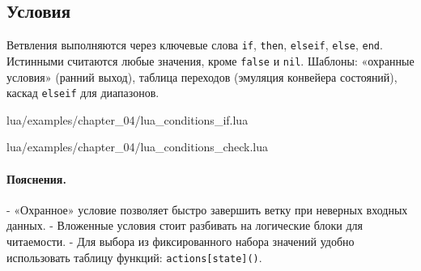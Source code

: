 \subsection{Условия}
Ветвления выполняются через ключевые слова \texttt{if}, \texttt{then}, \texttt{elseif}, \texttt{else}, \texttt{end}. Истинными считаются любые значения, кроме \texttt{false} и \texttt{nil}. Шаблоны: «охранные условия» (ранний выход), таблица переходов (эмуляция конвейера состояний), каскад \texttt{elseif} для диапазонов.
\begin{codefile}{lua/examples/chapter_04/lua_conditions_if.lua}
\end{codefile}
\begin{codefile}{lua/examples/chapter_04/lua_conditions_check.lua}
\end{codefile}
\paragraph{Пояснения.}
- «Охранное» условие позволяет быстро завершить ветку при неверных входных данных.
- Вложенные условия стоит разбивать на логические блоки для читаемости.
- Для выбора из фиксированного набора значений удобно использовать таблицу функций: \verb|actions[state]()|.

